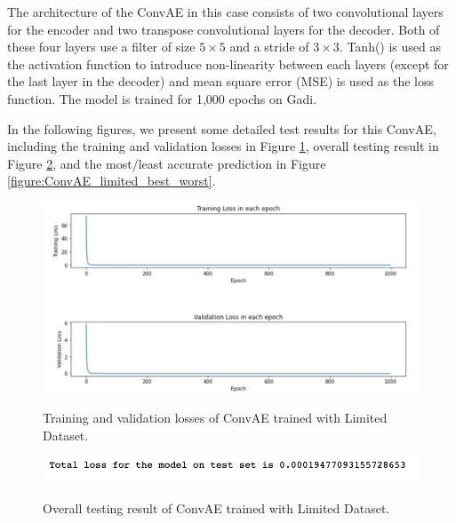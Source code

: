 The architecture of the ConvAE in this case consists of two convolutional layers for the encoder and two transpose convolutional layers for the decoder. Both of these four layers use a filter of size $5 \times 5$ and a stride of $3 \times 3$. Tanh() is used as the activation function to introduce non-linearity between each layers (except for the last layer in the decoder) and mean square error (MSE) is used as the loss function. The model is trained for 1,000 epochs on Gadi.

In the following figures, we present some detailed test results for this ConvAE, including the training and validation losses in Figure \ref{figure:ConvAE_limited_losses}, overall testing result in Figure \ref{figure:ConvAE_limited_testing}, and the most/least accurate prediction in 
Figure \ref{figure:ConvAE_limited_best_worst}.

\begin{figure}[H]
    \caption{Training and validation losses of ConvAE trained with Limited Dataset.}
    \includegraphics[scale=0.6]{figures/mantle_convection_images/limited_dataset/ConvAE_trainingData.png}
    \label{figure:ConvAE_limited_losses}
\end{figure}

\begin{figure}[H]
    \caption{Overall testing result of ConvAE trained with Limited Dataset.}
    \includegraphics[scale=0.8]{figures/mantle_convection_images/limited_dataset/ConvAE_OverallTesting.png}
    \label{figure:ConvAE_limited_testing}
\end{figure}

